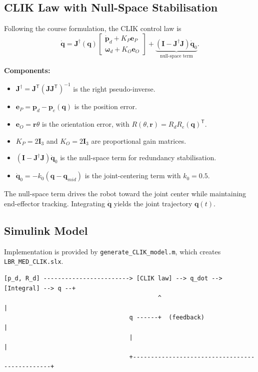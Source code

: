 \documentclass[11pt,a4paper]{article}
\newcommand{\J}{\mathbf{J}}
\newcommand{\I}{\mathbf{I}}
\newcommand{\pvec}{\mathbf{p}}
\newcommand{\qvec}{\mathbf{q}}
\newcommand{\wvec}{\boldsymbol{\omega}}
\newcommand{\trans}[1]{{#1}^{\mathsf{T}}}
\begin{document}
\subsection{CLIK Law with Null-Space Stabilisation}

Following the course formulation, the CLIK control law is
\[
  \dot{\qvec} =
  \J^{\dagger}(\qvec)
  \begin{bmatrix}
    \dot{\pvec}_d + K_P \mathbf{e}_P \\
    \wvec_d + K_O \mathbf{e}_O
  \end{bmatrix}
  +
  \underbrace{\left(\I - \J^{\dagger}\J\right)\dot{\qvec}_0}_{\text{null-space term}}.
\]

\noindent\textbf{Components:}
\begin{itemize}
  \item $\J^{\dagger} = \trans{\J}(\J\trans{\J})^{-1}$ is the right pseudo-inverse.
  \item $\mathbf{e}_P = \pvec_d - \pvec_e(\qvec)$ is the position error.
  \item $\mathbf{e}_O = \mathbf{r}\theta$ is the orientation error, with $R(\theta,\mathbf{r}) = R_d\trans{R_e(\qvec)}$.
  \item $K_P = 2\I_3$ and $K_O = 2\I_3$ are proportional gain matrices.
  \item $(\I - \J^{\dagger}\J)\dot{\qvec}_0$ is the null-space term for redundancy stabilisation.
  \item $\dot{\qvec}_0 = -k_0(\qvec - \qvec_{mid})$ is the joint-centering term with $k_0 = 0.5$.
\end{itemize}

The null-space term drives the robot toward the joint center while maintaining end-effector tracking.
Integrating $\dot{\qvec}$ yields the joint trajectory $\qvec(t)$.

\subsection{Simulink Model}

Implementation is provided by \texttt{generate\_CLIK\_model.m}, which creates \texttt{LBR\_MED\_CLIK.slx}.

\begin{verbatim}
[p_d, R_d] ------------------------> [CLIK law] --> q_dot --> [Integral] --> q --+
                                           ^                                       |
                                   q ------+  (feedback)                          |
                                   |                                               |
                                   +-----------------------------------------------+
\end{verbatim}
\end{document}

